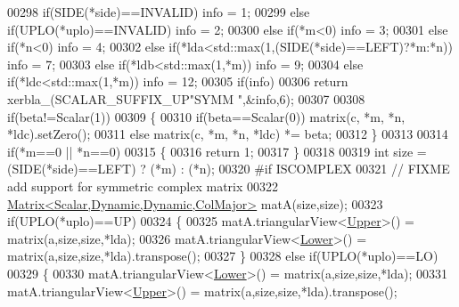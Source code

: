 \begin{DoxyCode}
00298   \textcolor{keywordflow}{if}(SIDE(*side)==INVALID)                                            info = 1;
00299   \textcolor{keywordflow}{else} \textcolor{keywordflow}{if}(UPLO(*uplo)==INVALID)                                       info = 2;
00300   \textcolor{keywordflow}{else} \textcolor{keywordflow}{if}(*m<0)                                                       info = 3;
00301   \textcolor{keywordflow}{else} \textcolor{keywordflow}{if}(*n<0)                                                       info = 4;
00302   \textcolor{keywordflow}{else} \textcolor{keywordflow}{if}(*lda<std::max(1,(SIDE(*side)==LEFT)?*m:*n))                 info = 7;
00303   \textcolor{keywordflow}{else} \textcolor{keywordflow}{if}(*ldb<std::max(1,*m))                                        info = 9;
00304   \textcolor{keywordflow}{else} \textcolor{keywordflow}{if}(*ldc<std::max(1,*m))                                        info = 12;
00305   \textcolor{keywordflow}{if}(info)
00306     \textcolor{keywordflow}{return} xerbla\_(SCALAR\_SUFFIX\_UP\textcolor{stringliteral}{"SYMM "},&info,6);
00307 
00308   \textcolor{keywordflow}{if}(beta!=Scalar(1))
00309   \{
00310     \textcolor{keywordflow}{if}(beta==Scalar(0)) matrix(c, *m, *n, *ldc).setZero();
00311     \textcolor{keywordflow}{else}                matrix(c, *m, *n, *ldc) *= beta;
00312   \}
00313 
00314   \textcolor{keywordflow}{if}(*m==0 || *n==0)
00315   \{
00316     \textcolor{keywordflow}{return} 1;
00317   \}
00318 
00319   \textcolor{keywordtype}{int} size = (SIDE(*side)==LEFT) ? (*m) : (*n);
00320 \textcolor{preprocessor}{  #if ISCOMPLEX}
00321   \textcolor{comment}{// FIXME add support for symmetric complex matrix}
00322   \hyperlink{group___core___module_class_eigen_1_1_matrix}{Matrix<Scalar,Dynamic,Dynamic,ColMajor>} matA(size,size);
00323   \textcolor{keywordflow}{if}(UPLO(*uplo)==UP)
00324   \{
00325     matA.triangularView<\hyperlink{group__enums_gga39e3366ff5554d731e7dc8bb642f83cda6bcb58be3b8b8ec84859ce0c5ac0aaec}{Upper}>() = matrix(a,size,size,*lda);
00326     matA.triangularView<\hyperlink{group__enums_gga39e3366ff5554d731e7dc8bb642f83cda891792b8ed394f7607ab16dd716f60e6}{Lower}>() = matrix(a,size,size,*lda).transpose();
00327   \}
00328   \textcolor{keywordflow}{else} \textcolor{keywordflow}{if}(UPLO(*uplo)==LO)
00329   \{
00330     matA.triangularView<\hyperlink{group__enums_gga39e3366ff5554d731e7dc8bb642f83cda891792b8ed394f7607ab16dd716f60e6}{Lower}>() = matrix(a,size,size,*lda);
00331     matA.triangularView<\hyperlink{group__enums_gga39e3366ff5554d731e7dc8bb642f83cda6bcb58be3b8b8ec84859ce0c5ac0aaec}{Upper}>() = matrix(a,size,size,*lda).transpose();

\end{DoxyCode}
